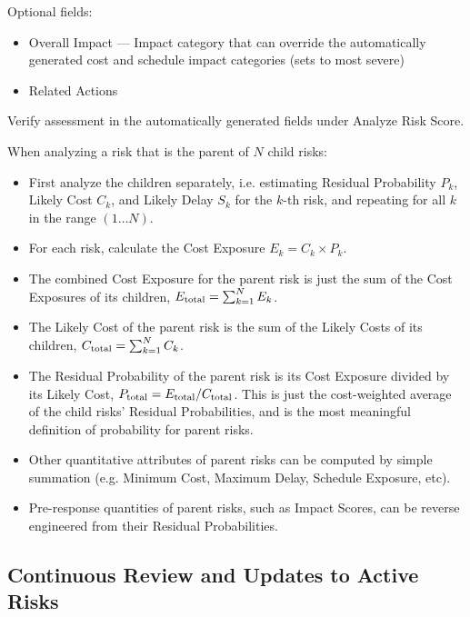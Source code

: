 Optional fields:
\begin{itemize}
	\item Overall Impact --- Impact category that can override the automatically generated cost and schedule impact categories (sets to most severe)
	\item Related Actions
\end{itemize}

Verify assessment in the automatically generated fields under Analyze Risk Score.

When analyzing a risk that is the parent of $N$ child risks:
\begin{itemize}
	\item First analyze the children separately, i.e. estimating Residual Probability $P_k$, Likely Cost $C_k$, and Likely Delay $S_k$ for the $k$-th risk, and repeating for all $k$ in the range $(1 \ldots N)$.
	\item For each risk, calculate the Cost Exposure $E_k = C_k \times P_k$.
	\item The combined Cost Exposure for the parent risk is just the sum of the Cost Exposures of its children, $E_{\rm total} = \sum_{k=1}^N E_k$.
	\item The Likely Cost of the parent risk is the sum of the Likely Costs of its children, $C_{\rm total} = \sum_{k=1}^N C_k$.
	\item The Residual Probability of the parent risk is its Cost Exposure divided by its Likely Cost, $P_{\rm total} = E_{\rm total} / C_{\rm total}$.
	This is just the cost-weighted average of the child risks' Residual Probabilities, and is the most meaningful definition of probability for parent risks.
	\item Other quantitative attributes of parent risks can be computed by simple summation (e.g. Minimum Cost, Maximum Delay, Schedule Exposure, etc).
	\item Pre-response quantities of parent risks, such as Impact Scores, can be reverse engineered from their Residual Probabilities.
\end{itemize}

\subsection{Continuous Review and Updates to Active Risks}


